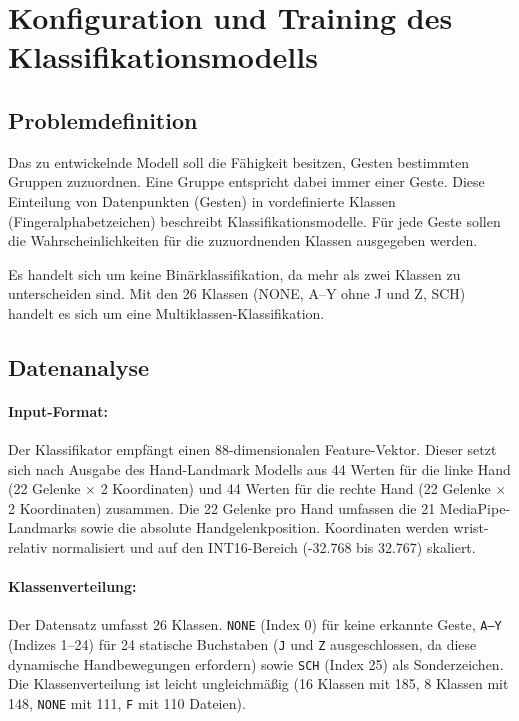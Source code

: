 \section{Konfiguration und Training des Klassifikationsmodells}\label{sec:klassifikationsmodell}
\subsection{Problemdefinition}\label{sub:problemdefinition}

Das zu entwickelnde Modell soll die Fähigkeit besitzen, Gesten bestimmten Gruppen zuzuordnen. Eine Gruppe entspricht dabei immer einer Geste. Diese Einteilung von Datenpunkten (Gesten) in vordefinierte Klassen (Fingeralphabetzeichen) beschreibt Klassifikationsmodelle. Für jede Geste sollen die Wahrscheinlichkeiten für die zuzuordnenden Klassen ausgegeben werden.

Es handelt sich um keine Binärklassifikation, da mehr als zwei Klassen zu unterscheiden sind. Mit den 26 Klassen (NONE, A–Y ohne J und Z, SCH) handelt es sich um eine Multiklassen-Klassifikation.

\subsection{Datenanalyse}\label{sub:datenanalyse}

\paragraph{Input-Format:} Der Klassifikator empfängt einen 88-dimensionalen Feature-Vektor. Dieser setzt sich nach Ausgabe des Hand-Landmark Modells aus 44 Werten für die linke Hand (22 Gelenke $\times$ 2 Koordinaten) und 44 Werten für die rechte Hand (22 Gelenke $\times$ 2 Koordinaten) zusammen. Die 22 Gelenke pro Hand umfassen die 21 MediaPipe-Landmarks sowie die absolute Handgelenkposition. Koordinaten werden wrist-relativ normalisiert und auf den INT16-Bereich ({-}32.768 bis 32.767) skaliert.

\paragraph{Klassenverteilung:} Der Datensatz umfasst 26 Klassen. \texttt{NONE} (Index 0) für keine erkannte Geste, \texttt{A--Y} (Indizes 1--24) für 24 statische Buchstaben (\texttt{J} und \texttt{Z} ausgeschlossen, da diese dynamische Handbewegungen erfordern) sowie \texttt{SCH} (Index 25) als Sonderzeichen. Die Klassenverteilung ist leicht ungleichmäßig (16 Klassen mit 185, 8 Klassen mit 148, \texttt{NONE} mit 111, \texttt{F} mit 110 Dateien).

